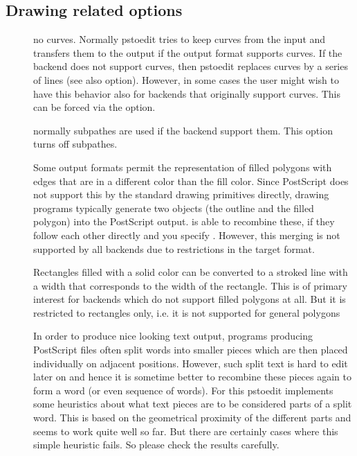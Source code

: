\documentclass[english,a4paper]{article}
\begin{document}
\subsection{Drawing related options}
\begin{description}
\item[] 
no curves.  
Normally pstoedit tries to keep curves from the input and transfers them to the output if the output format supports curves. If the backend does not support curves, then pstoedit replaces curves by a series of lines (see also  option). However, in some cases the user might wish to have this behavior also for backends that originally support curves. This can be forced via the  option. 


\item[] 
normally subpathes are used if the backend support them. This option turns off subpathes.


\item[] 
Some output formats permit the representation of filled polygons with edges that are in a different color than the fill color. Since PostScript does not support this by the standard drawing primitives directly, drawing programs typically generate two objects (the outline and the filled polygon) into the PostScript output.  is able to recombine these, if they follow each other directly and you specify . However, this merging is not supported by all backends due to restrictions in the target format.


\item[] 
Rectangles filled with a solid color can be converted to a stroked line with a width that corresponds to the width of the rectangle. This is of primary interest for backends which do not support filled polygons at all. But it is restricted to rectangles only, i.e. it is not supported for general polygons


\item[] 
In order to produce nice looking text output, programs producing PostScript files often split words into smaller pieces which are then placed individually on adjacent positions. However, such split text is hard to edit later on and hence it is sometime better to recombine these pieces again to form a word (or even sequence of words). For this pstoedit implements some heuristics about what text pieces are to be considered parts of a split word. This is based on the geometrical proximity of the different parts and seems to work quite well so far. But there are certainly cases where this simple heuristic fails. So please check the results carefully.



\end{description}
\end{document}
